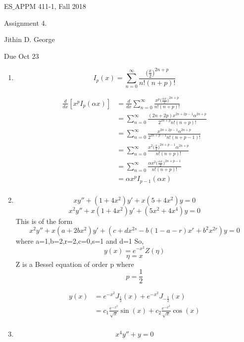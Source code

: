 \documentclass[letterpaper,12pt]{article}
\begin{document}




\noindent
{\scriptsize ES$\_$APPM 411-1, Fall 2018} \hfill

\begin{center}
\large
Assignment 4.
\normalsize

Jithin D. George
\end{center}

\noindent
Due Oct 23
\vspace{.3in}




\noindent


\begin{enumerate}
\item

 \[I_p(x)= \sum_{n=0}^{\infty} \frac{\big(\frac{x}{2}\big)^{2n+p}}{n!(n+p)!}\]

  \begin{align*}
	\frac{d}{dx}[x^pI_p(\alpha x)] &= \frac{d}{dx} \sum_{n=0}^{\infty} \frac{x^p\big(\frac{\alpha x}{2}\big)^{2n+p}}{n!(n+p)!}
	\\
	&=  \sum_{n=0}^{\infty} \frac{(2n+2p)x^{2n+2p-1} \alpha^{2n+p}}{2^{2n+p} n!(n+p)!}\\
	&=  \sum_{n=0}^{\infty} \frac{x^{2n+2p-1}\alpha^{2n+p}}{2^{2n+p-1} n!(n+p-1)!}\\
	&=\sum_{n=0}^{\infty} \frac{x^2\big(\frac{x}{2}\big)^{2n+p-1} \alpha^{2n+p}}{n!(n+p)!}\\
		&=\sum_{n=0}^{\infty} \frac{\alpha x^2\big(\frac{\alpha x}{2}\big)^{2n+p-1}}{n!(n+p)!}\\\
	&= \alpha x^pI_{p-1}(\alpha x)\\
	\end{align*}

\item
\[x y'' +(1+4x^2)y'+x(5+4x^2)y=0\]
\[x^2 y'' +x(1+4x^2)y'+(5x^2+4x^4)y=0\]
This is of the form
\[x^2 y'' +x(a+2bx^2)y'+(c+dx^{2s}-b(1-a-r)x^r+b^2x^{2r})y=0\]
where a=1,b=2,r=2,c=0,s=1 and d=1
So,
\[y(x)= e^{-x^2}Z(\eta )\]
\[\eta = x\]
Z is a Bessel equation of order p where
\[p =  \frac{1}{2}\]

\begin{align*}
y(x) &= e^{-x^2}J_{\frac{1}{2}}(x)+ e^{-x^2} J_{-\frac{1}{2}}(x)\\
&= c_1 \frac{e^{-x^2}}{\sqrt{x}} \sin(x )+c_2  \frac{e^{-x^2}}{\sqrt{x}} \cos(x) \\
\end{align*}
\item
\[x^4 y'' +y =0\]


\end{enumerate}
\end{document}
